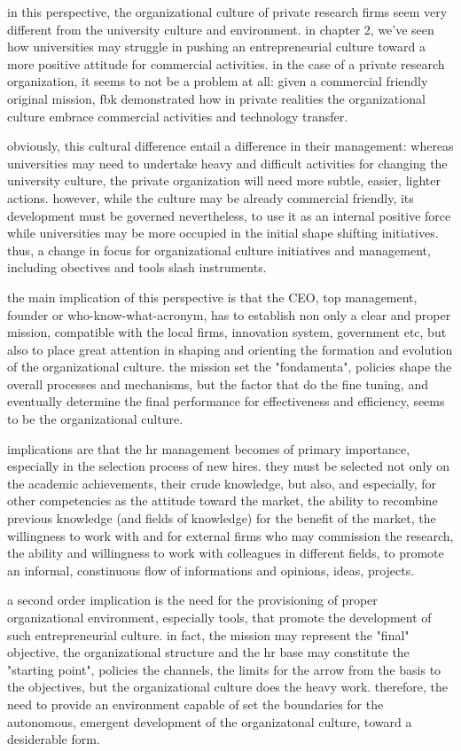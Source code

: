 in this perspective, the organizational culture of private research firms seem very different from the university culture and environment. in chapter 2, we've seen how universities may struggle in pushing an entrepreneurial culture toward a more positive attitude for commercial activities. in the case of a private research organization, it seems to not be a problem at all: given a commercial friendly original mission, fbk demonstrated how in private realities the organizational culture embrace commercial activities and technology transfer. 

obviously, this cultural difference entail a difference in their management: whereas universities may need to undertake heavy and difficult activities for changing the university culture, the private organization will need more subtle, easier, lighter actions. however, while the culture may be already commercial friendly, its development must be governed nevertheless, to use it as an internal positive force while universities may be more occupied in the initial shape shifting initiatives. thus, a change in focus for organizational culture initiatives and management, including obectives and tools slash instruments.

the main implication of this perspective is that the CEO, top management, founder or who-know-what-acronym, has to establish non only a clear and proper mission, compatible with the local firms, innovation system, government etc, but also to place great attention in shaping and orienting the formation and evolution of the organizational culture. the mission set the "fondamenta", policies shape the overall processes and mechanisms, but the factor that do the fine tuning, and eventually determine the final performance for effectiveness and efficiency, seems to be the organizational culture.

implications are that the hr management becomes of primary importance, especially in the selection process of new hires. they must be selected not only on the academic achievements, their crude knowledge, but also, and especially, for other competencies as the attitude toward the market, the ability to recombine previous knowledge (and fields of knowledge) for the benefit of the market, the willingness to work with and for external firms who may commission the research, the ability and willingness to work with colleagues in different fields, to promote an informal, constinuous flow of informations and opinions, ideas, projects. 

a second order implication is the need for the provisioning of proper organizational environment, especially tools, that promote the development of such entrepreneurial culture. in fact, the mission may represent the "final" objective, the organizational structure and the hr base may constitute the "starting point", policies the channels, the limits for the arrow from the basis to the objectives, but the organizational culture does the heavy work. therefore, the need to provide an environment capable of set the boundaries for the autonomous, emergent development of the organizatonal culture, toward a desiderable form.

